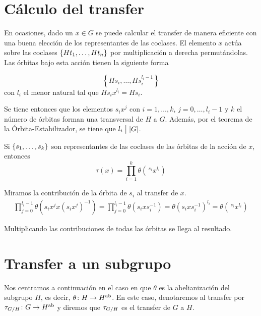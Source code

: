 \section{Cálculo del transfer}

En ocasiones, dado un $x\in G$ se puede calcular el transfer de manera eficiente con una buena elección de los representantes de las coclases. El elemento $x$ actúa sobre las coclases $\{Ht_1,\ldots,Ht_n\}$ por multiplicación a derecha permutándolas. Las órbitas bajo esta acción tienen la siguiente forma

\begin{equation}
	\left\{Hs_i,\ldots,Hs_i^{l_i-1}\right\}
\end{equation}
con $l_i$ el menor natural tal que $Hs_ix^{l_i} = Hs_i$.

Se tiene entonces que los elementos $s_ix^j$ con $i=1,\ldots,k$, $j=0,\ldots,l_i-1$ y $k$ el número de órbitas forman una transversal de $H$ a $G$. Además, por el teorema de la Órbita-Estabilizador, se tiene que $l_i \bigm| \left|G\right|$.

\begin{lema}
	Si $\{s_1,\ldots,s_k\}$ son representantes de las coclases de las órbitas de la acción de $x$, entonces
	\begin{equation}
		 \tau(x) = \prod_{i=1}^k \theta(\,^{s_i}x^{l_i})
	\end{equation}
	\begin{demostracion}
		Miramos la contribución de la órbita de $s_i$ al transfer de $x$.
		\begin{align*}
			\prod_{j=0}^{l_i-1}\theta(s_ix^j x (s_ix^j)^{-1}) = \prod_{j=0}^{l_i-1}\theta(s_ixs_i^{-1}) = \theta(s_ixs_i^{-1})^{l_i} = \theta(\,^{s_i}x^{l_i})
		\end{align*}
		
		Multiplicando las contribuciones de todas las órbitas se llega al resultado.
	\end{demostracion}
\end{lema}

\section{Transfer a un subgrupo}

Nos centramos a continuación en el caso en que $\theta$ es la abelianización del subgrupo $H$, es decir, $\theta\colon H\to H^\text{ab}$. En este caso, denotaremos al transfer por $\tau_{G/ H}\colon G\to H^\text{ab}$ y diremos que $\tau_{G/ H}$ es el transfer de $G$ a $H$. %


